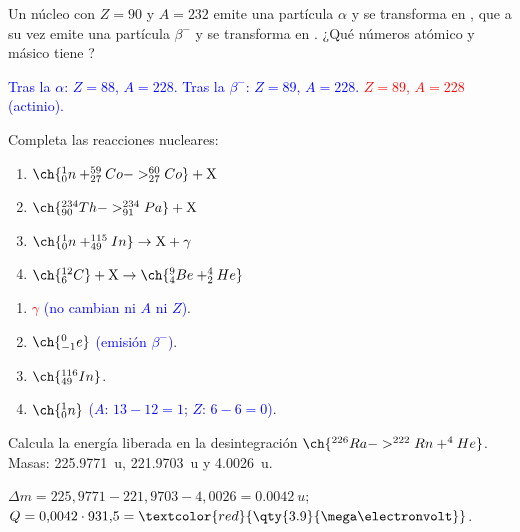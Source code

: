\begin{exercise}
    Un núcleo  con \(Z = 90\) y \(A = 232\) emite una partícula \(\alpha\) y se transforma en , que a su vez emite una partícula
    \(\beta^-\) y se transforma en . ¿Qué números atómico y másico tiene ?
    \begin{solu}
        \textcolor{blue}{Tras la \(\alpha\): \(Z = 88\), \(A = 228\). Tras la \(\beta^-\): \(Z = 89\), \(A = 228\).} \textcolor{red}{\(Z = 89\), \(A = 228\)} \textcolor{blue}{(actinio).}
    \end{solu}
\end{exercise}

\begin{exercise}
    Completa las reacciones nucleares:
    \begin{enumerate}[label=\letraminuscula]
        \item \(\ch{^1_0n + ^{59}_{27}Co -> ^{60}_{27}Co} + \mathrm{X}\)
        \item \(\ch{^{234}_{90}Th -> ^{234}_{91}Pa} + \mathrm{X}\)
        \item \(\ch{^1_0n + ^{115}_{49}In} \rightarrow \mathrm{X} + \gamma\)
        \item \(\ch{^{12}_6C} + \mathrm{X} \rightarrow \ch{^9_4Be + ^4_2He}\)
    \end{enumerate}
    \begin{solu}
        \begin{enumerate}[label=\letraminuscula]
            \item \textcolor{red}{\(\gamma\)} \textcolor{blue}{(no cambian ni \(A\) ni \(Z\))}.
            \item \textcolor{red}{\(\ch{^0_{-1}e}\)} \textcolor{blue}{(emisión \(\beta^-\))}.
            \item \textcolor{red}{\(\ch{^{116}_{49}In}\)}.
            \item \textcolor{red}{\(\ch{^1_0n}\)} \textcolor{blue}{(\(A\): \(13 - 12 = 1\); \(Z\): \(6 - 6 = 0\))}.
        \end{enumerate}
    \end{solu}
\end{exercise}

\begin{exercise}
    Calcula la energía liberada en la desintegración \(\ch{^{226}Ra -> ^{222}Rn + ^4He}\). Masas: \qty{225.9771}{u}, \qty{221.9703}{u} y \qty{4.0026}{u}.
    \begin{solu}
        \(\Delta m = 225{,}9771 - 221{,}9703 - 4{,}0026 = \qty{0.0042}{u}\); \(Q = 0{,}0042\cdot 931{,}5 = \textcolor{red}{\qty{3.9}{\mega\electronvolt}}\).
    \end{solu}
\end{exercise}

